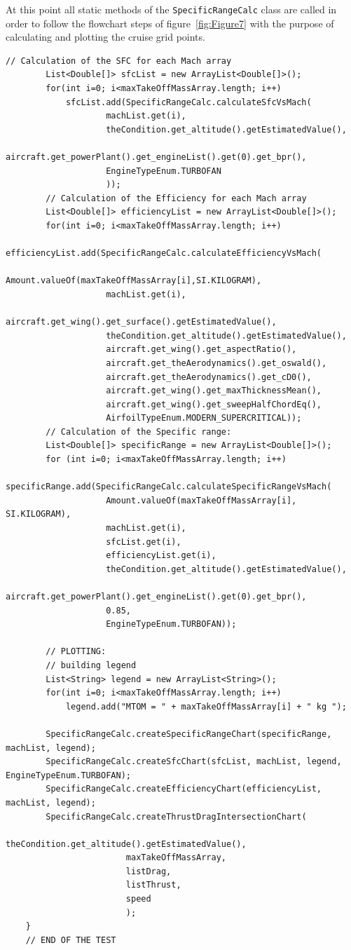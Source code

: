\bigskip
\noindent
At this point all static methods of the \lstinline[language=Java]!SpecificRangeCalc! class are called in order to follow the flowchart steps of figure~\ref{fig:Figure7} with the purpose of calculating and plotting the cruise grid points.

\bigskip
\begin{lstlisting}[caption={Intersection of drag and thrust curves in Specific Range test - B747-100B}, captionpos=b, tabsize=2]
		// Calculation of the SFC for each Mach array
		List<Double[]> sfcList = new ArrayList<Double[]>();
		for(int i=0; i<maxTakeOffMassArray.length; i++)
			sfcList.add(SpecificRangeCalc.calculateSfcVsMach(
					machList.get(i),
					theCondition.get_altitude().getEstimatedValue(),
					aircraft.get_powerPlant().get_engineList().get(0).get_bpr(),
					EngineTypeEnum.TURBOFAN
					));
		// Calculation of the Efficiency for each Mach array
		List<Double[]> efficiencyList = new ArrayList<Double[]>();
		for(int i=0; i<maxTakeOffMassArray.length; i++)
			efficiencyList.add(SpecificRangeCalc.calculateEfficiencyVsMach(
					Amount.valueOf(maxTakeOffMassArray[i],SI.KILOGRAM),
					machList.get(i),
					aircraft.get_wing().get_surface().getEstimatedValue(),
					theCondition.get_altitude().getEstimatedValue(),
					aircraft.get_wing().get_aspectRatio(),
					aircraft.get_theAerodynamics().get_oswald(),
					aircraft.get_theAerodynamics().get_cD0(),
					aircraft.get_wing().get_maxThicknessMean(),
					aircraft.get_wing().get_sweepHalfChordEq(),
					AirfoilTypeEnum.MODERN_SUPERCRITICAL));
		// Calculation of the Specific range:
		List<Double[]> specificRange = new ArrayList<Double[]>();
		for (int i=0; i<maxTakeOffMassArray.length; i++)
			specificRange.add(SpecificRangeCalc.calculateSpecificRangeVsMach(
					Amount.valueOf(maxTakeOffMassArray[i], SI.KILOGRAM),
					machList.get(i),
					sfcList.get(i),
					efficiencyList.get(i),
					theCondition.get_altitude().getEstimatedValue(),
					aircraft.get_powerPlant().get_engineList().get(0).get_bpr(),
					0.85,
					EngineTypeEnum.TURBOFAN));
	
		// PLOTTING:			
		// building legend
		List<String> legend = new ArrayList<String>();
		for(int i=0; i<maxTakeOffMassArray.length; i++)
			legend.add("MTOM = " + maxTakeOffMassArray[i] + " kg ");
		
		SpecificRangeCalc.createSpecificRangeChart(specificRange, machList, legend);
		SpecificRangeCalc.createSfcChart(sfcList, machList, legend, EngineTypeEnum.TURBOFAN);
		SpecificRangeCalc.createEfficiencyChart(efficiencyList, machList, legend);
		SpecificRangeCalc.createThrustDragIntersectionChart(
						theCondition.get_altitude().getEstimatedValue(),
						maxTakeOffMassArray,
						listDrag,
						listThrust,
						speed
						);	
	}
	// END OF THE TEST
\end{lstlisting}

